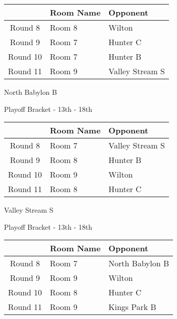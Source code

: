 \documentclass{article}%
\begin{document}
\vspace*{4pt}%
%
\begin{tabularx}{\textwidth}{|c|Y|Y|}%
\hline%
&Room Name&Opponent\\%
\hline%
Round 8&Room 8&Wilton\\%
Round 9&Room 7&Hunter C\\%
Round 10&Room 7&Hunter B\\%
Round 11&Room 9&Valley Stream S\\%
\hline%
\end{tabularx}%
\vspace*{80pt}%
\linebreak%
\newpage%
\begin{center}%
\begin{Huge}%
North Babylon B%
\end{Huge}%
\vspace*{12pt}%
\linebreak%
\begin{Large}%
Playoff Bracket {-} 13th {-} 18th%
\end{Large}%
\end{center}%
\vspace*{4pt}%
%
\begin{tabularx}{\textwidth}{|c|Y|Y|}%
\hline%
&Room Name&Opponent\\%
\hline%
Round 8&Room 7&Valley Stream S\\%
Round 9&Room 8&Hunter B\\%
Round 10&Room 9&Wilton\\%
Round 11&Room 8&Hunter C\\%
\hline%
\end{tabularx}%
\vspace*{80pt}%
\linebreak%
\newpage%
\begin{center}%
\begin{Huge}%
Valley Stream S%
\end{Huge}%
\vspace*{12pt}%
\linebreak%
\begin{Large}%
Playoff Bracket {-} 13th {-} 18th%
\end{Large}%
\end{center}%
\vspace*{4pt}%
%
\begin{tabularx}{\textwidth}{|c|Y|Y|}%
\hline%
&Room Name&Opponent\\%
\hline%
Round 8&Room 7&North Babylon B\\%
Round 9&Room 9&Wilton\\%
Round 10&Room 8&Hunter C\\%
Round 11&Room 9&Kings Park B\\%
\hline%
\end{tabularx}%
\end{document}
